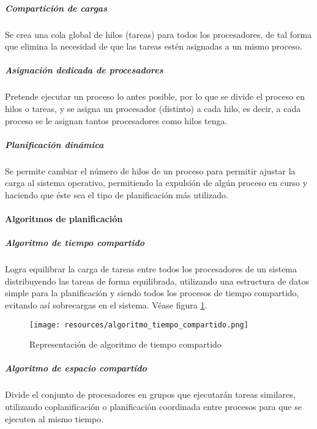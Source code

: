 \documentclass[a4paper, 11pt, titlepage]{article}
\begin{document}
                \subparagraph{Compartición de cargas}

                    Se crea una cola global de hilos (tareas) para todos los procesadores, de tal forma que 
                    elimina la necesidad de que las tareas estén asignadas a un mismo proceso.

                \subparagraph{Asignación dedicada de procesadores}

                    Pretende ejecutar un proceso lo antes posible, por lo que se divide el proceso en 
                    hilos o tareas, y se asigna un procesador (distinto) a cada hilo, es decir, a cada
                    proceso se le asignan tantos procesadores como hilos tenga. 

                \subparagraph{Planificación dinámica}

                    Se permite cambiar el número de hilos de un proceso para permitir ajustar la carga al
                    sistema operativo, permitiendo la expulsión de algún proceso en curso y haciendo que éste 
                    sea el tipo de planificación más utilizado.

            \paragraph{Algoritmos de planificación}

                \subparagraph{Algoritmo de tiempo compartido}

                    Logra equilibrar la carga de tareas entre todos los procesadores de un sistema 
                    distribuyendo las tareas de forma equilibrada, utilizando una estructura de datos 
                    simple para la planificación y siendo todos los procesos de tiempo compartido, evitando 
                    así sobrecargas en el sistema. Véase figura \ref{algoritmo_tiempo_compartido}.

                    \begin{figure}[htp]
                        \centering
                        \texttt{[image: resources/algoritmo\_tiempo\_compartido.png]}
                        \caption{Representación de algoritmo de tiempo compartido}
                        \label{algoritmo_tiempo_compartido}
                    \end{figure}

                \subparagraph{Algoritmo de espacio compartido}

                    Divide el conjunto de procesadores en grupos que ejecutarán tareas similares, utilizando 
                    coplanificación o planificación coordinada entre procesos para que se ejecuten al mismo tiempo.
\end{document}
